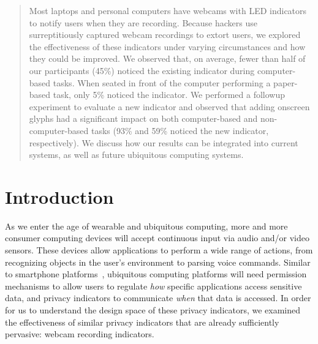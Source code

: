 \documentclass{sigchi}
\begin{document}
\maketitle

\begin{abstract}
Most laptops and personal computers have webcams with LED indicators to notify users when they are recording. Because hackers use surreptitiously captured webcam recordings to extort users, we explored the effectiveness of these indicators under varying circumstances and how they could be improved.  We observed that, on average, fewer than half of our participants (45\%) noticed the existing indicator during computer-based tasks.  When seated in front of the computer performing a paper-based task, only 5\% noticed the indicator.  We performed a followup experiment to evaluate a new indicator and observed that adding onscreen glyphs had a significant impact on both computer-based and non-computer-based tasks (93\% and 59\% noticed the new indicator, respectively).  We discuss how our results can be integrated into current systems, as well as future ubiquitous computing systems.
\end{abstract}



\section{Introduction}

As we enter the age of wearable and ubiquitous computing, more and more consumer computing devices will accept continuous input via audio and/or video sensors.  These devices allow applications to perform a wide range of actions, from recognizing objects in the user's environment to parsing voice commands.  Similar to smartphone platforms~\cite{Felt2011}, ubiquitous computing platforms will need permission mechanisms to allow users to regulate {\it how} specific applications access sensitive data, and privacy indicators to communicate {\it when} that data is accessed. In order for us to understand the design space of these privacy indicators, we examined the effectiveness of similar privacy indicators that are already sufficiently pervasive: webcam recording indicators.
\end{document}
